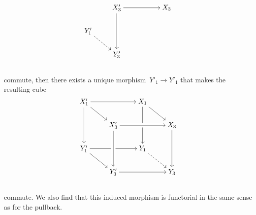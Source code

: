 \begin{remark*}
\begin{enumerate}
\[\begin{tikzcd}[cramped]
            {}
          & X'_3
          & {}
          & X_3
            \arrow[from=ll, crossing over]
          \\
            Y'_1
            \arrow[dashed]{dr}
          & {}
          & {}
          & {}
          \\
            {}
          & Y'_3
            \arrow[from=uu, crossing over]
          & {}
          & {}
          \\
        \end{tikzcd}
      \]
      commute, then there exists a unique morphism~$Y'_1 \to Y'_1$ that makes the resulting cube
      \[
        \begin{tikzcd}[cramped]
            X'_1
            \arrow{rr}
            \arrow{dr}
            \arrow{dd}
          & {}
          & X_1
            \arrow{dd}
            \arrow{dr}
          & {}
          \\
            {}
          & X'_3
          & {}
          & X_3
            \arrow[from=ll, crossing over]
            \arrow{dd}
          \\
            Y'_1
            \arrow{rr}
            \arrow{dr}
          & {}
          & Y_1
            \arrow[dashed]{dr}
          & {}
          \\
            {}
          & Y'_3
            \arrow[from=uu, crossing over]
            \arrow{rr}
          & {}
          & Y_3
          \\
        \end{tikzcd}
      \]
      commute.
      We also find that this induced morphism is functorial in the same sense as for the pullback.
  \end{enumerate}
\end{remark*}

